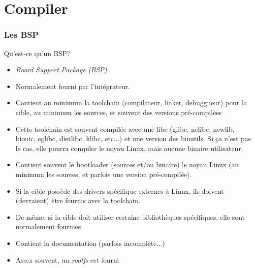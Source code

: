 %
%
%

\part{Compiler}

\begin{frame}
  \partpage
\end{frame}

\begin{frame}
  \tableofcontents[currentpart]
\end{frame}

\section{Les BSP}

\begin{frame}[fragile=singleslide]{Qu'est-ce qu'un BSP?}
  \begin{itemize} 
  \item \emph{Board Support Package (BSP)}
  \item Normalement fourni par l'intégrateur.
  \item  Contient  au   minimum  la  toolchain  (compilateur,  linker,
    debuggueur) pour la cible, au  minimum les sources, et souvent des
    versions pré-compilées
  \item  Cette toolchain est  souvent compilée  avec une  libc (glibc,
    µclibc, newlib,  bionic, eglibc,  dietlibc, klibc, etc...)  et une
    version des binutils. Si ça n'est pas le cas, elle pourra compiler
    le noyau Linux, mais aucune binaire utilisateur.
  \item  Contient souvent  le  bootloader (sources  et/ou binaire)  le
    noyau  Linux  (au minimum  les  sources,  et  parfois une  version
    pré-compilée).
  \item Si la  cible possède des drivers spécifique  externes à Linux,
    ils doivent (devraient) être fournis avec la toolchain.
  \item  De même,  si la  cible doit  utiliser  certaine bibliothèques
    spécifiques, elle sont normalement fournies
  \item Contient la documentation (parfois incomplète...)
  \item Assez souvent, un \emph{rootfs} est fourni
  \end{itemize} 
\end{frame} 

